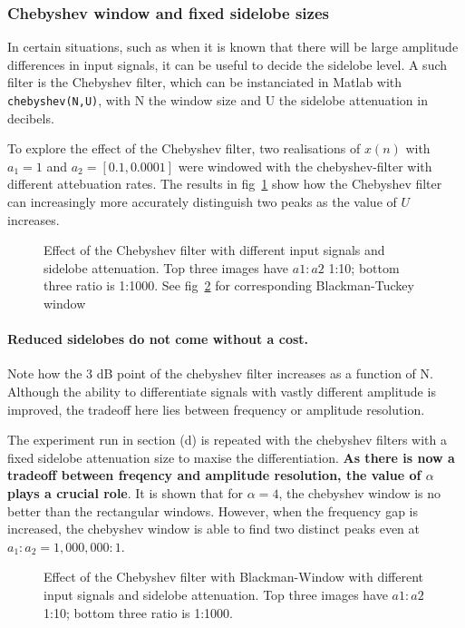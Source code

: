 \documentclass[main.tex]{subfiles}
\begin{document}
\subsubsection{Chebyshev window and fixed sidelobe sizes}

In certain situations, such as when it is known that there will be large amplitude differences in input signals, it can be useful to decide the sidelobe level. A such filter is the Chebyshev filter, which can be instanciated in Matlab with {\tt chebyshev(N,U)}, with N the window size and U the sidelobe attenuation in decibels.

To explore the effect of the Chebyshev filter, two realisations of $x(n)$ with $a_1 =1$ and $a_2=[0.1, 0.0001]$ were windowed with the chebyshev-filter with different attebuation rates. The results in fig~\ref{fig:q1_3_f} show how the Chebyshev filter can increasingly more accurately distinguish two peaks as the value of $U$ increases.

\begin{figure}[H]
	\centering 
	\resizebox{\textwidth}{!}{}
	\caption{Effect of the Chebyshev filter with different input signals and sidelobe attenuation. Top three images have $a1:a2$ 1:10; bottom three ratio is 1:1000. See fig~\ref{fig:q1_3_f_bw} for corresponding Blackman-Tuckey window}
	\label{fig:q1_3_f}
\end{figure}

\paragraph{Reduced sidelobes do not come without a cost.} Note how the 3 dB point of the chebyshev filter increases as a function of N. Although the ability to differentiate signals with vastly different amplitude is improved, the tradeoff here lies between frequency or amplitude resolution.

The experiment run in section (d) is repeated with the chebyshev filters with a fixed sidelobe attenuation size to maxise the differentiation. \textbf{As there is now a tradeoff between freqency and amplitude resolution, the value of $\alpha$ plays a crucial role}. It is shown that for $\alpha = 4$, the chebyshev window is no better than the rectangular windows. However, when the frequency gap is increased, the chebyshev window is able to find two distinct peaks even at $a_1:a_2 = 1,000,000:1$.




\begin{figure}[h]
	\centering 
	\resizebox{\textwidth}{!}{}
	\caption{Effect of the Chebyshev filter with Blackman-Window with different input signals and sidelobe attenuation. Top three images have $a1:a2$ 1:10; bottom three ratio is 1:1000.}
	\label{fig:q1_3_f_bw}
\end{figure}
\end{document}
